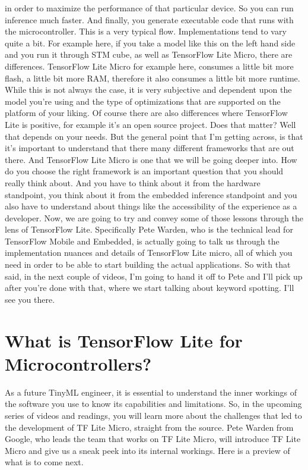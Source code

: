     in order to maximize the performance of that particular device.
    So you can run inference much faster.
    And finally, you generate executable code
    that runs with the microcontroller.
    This is a very typical flow.
    Implementations tend to vary quite a bit.
    For example here, if you take a model like this on the left hand side
    and you run it through STM cube, as well as TensorFlow Lite Micro,
    there are differences.
    TensorFlow Lite Micro for example here, consumes a little bit more
    flash, a little bit more RAM, therefore it also
    consumes a little bit more runtime.
    While this is not always the case, it is very subjective and dependent
    upon the model you're using and the type of optimizations that are supported
    on the platform of your liking.
    Of course there are also differences where TensorFlow Lite is positive,
    for example it's an open source project.
    Does that matter?
    Well that depends on your needs.
    But the general point that I'm getting across,
    is that it's important to understand that there many different frameworks
    that are out there.
    And TensorFlow Lite Micro is one that we will be going deeper into.
    How do you choose the right framework is an important question
    that you should really think about.
    And you have to think about it from the hardware standpoint,
    you think about it from the embedded inference standpoint
    and you also have to understand about things
    like the accessibility of the experience as a developer.
    Now, we are going to try and convey some of those lessons
    through the lens of TensorFlow Lite.
    Specifically Pete Warden, who is the technical lead for TensorFlow Mobile
    and Embedded, is actually going to talk us through the implementation nuances
    and details of TensorFlow Lite micro, all of which
    you need in order to be able to start building the actual applications.
    So with that said, in the next couple of videos,
    I'm going to hand it off to Pete and I'll
    pick up after you're done with that, where we
    start talking about keyword spotting.
    I'll see you there.

    
    
\section{What is TensorFlow Lite for Microcontrollers?}

As a future TinyML engineer, it is essential to understand the inner workings of the software you use to know its capabilities and limitations. So, in the upcoming series of videos and readings, you will learn more about the challenges that led to the development of TF Lite Micro, straight from the source. Pete Warden from Google, who leads the team that works on TF Lite Micro, will introduce TF Lite Micro and give us a sneak peek into its internal workings. Here is a preview of what is to come next.

